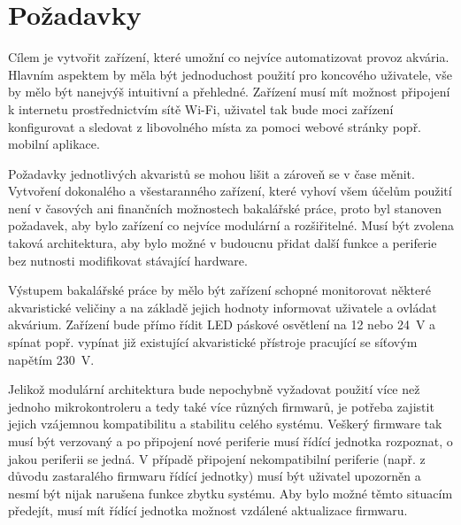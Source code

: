 \section{Požadavky}
\label{sec:pozadavky}
    Cílem je vytvořit zařízení, které umožní co nejvíce automatizovat provoz akvária. Hlavním aspektem by měla být jednoduchost použití pro koncového uživatele, vše by mělo být nanejvýš intuitivní a přehledné. Zařízení musí mít možnost připojení k internetu prostřednictvím sítě Wi-Fi, uživatel tak bude moci zařízení konfigurovat a sledovat z libovolného místa za pomoci webové stránky popř. mobilní aplikace.

    Požadavky jednotlivých akvaristů se mohou lišit a zároveň se v čase měnit. Vytvoření dokonalého a všestaranného zařízení, které vyhoví všem účelům použití není v časových ani finančních možnostech bakalářské práce, proto byl stanoven požadavek, aby bylo zařízení co nejvíce modulární a rozšiřitelné. Musí být zvolena taková architektura, aby bylo možné v budoucnu přidat další funkce a periferie bez nutnosti modifikovat stávající hardware.

    Výstupem bakalářské práce by mělo být zařízení schopné monitorovat některé akvaristické veličiny a na základě jejich hodnoty informovat uživatele a ovládat akvárium. Zařízení bude přímo řídit LED páskové osvětlení na 12 nebo \qty{24}{V} a spínat popř. vypínat již existující akvaristické přístroje pracující se síťovým napětím \qty{230}{V}.  

    Jelikož modulární architektura bude nepochybně vyžadovat použití více než jednoho mikrokontroleru a tedy také více různých firmwarů, je potřeba zajistit jejich vzájemnou kompatibilitu a stabilitu celého systému. Veškerý firmware tak musí být verzovaný a po připojení nové periferie musí řídící jednotka rozpoznat, o jakou periferii se jedná. V případě připojení nekompatibilní periferie (např. z důvodu zastaralého firmwaru řídící jednotky) musí být uživatel upozorněn a nesmí být nijak narušena funkce zbytku systému. Aby bylo možné těmto situacím předejít, musí mít řídící jednotka možnost vzdálené aktualizace firmwaru.